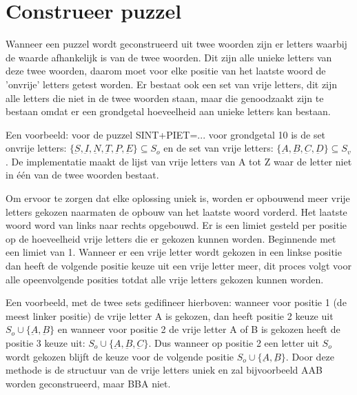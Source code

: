 \documentclass[twocolumn,10pt]{article}
\begin{document}
\section*{Construeer puzzel}
Wanneer een puzzel wordt geconstrueerd uit twee woorden zijn er letters waarbij de waarde afhankelijk is van de twee woorden. Dit zijn alle unieke letters van deze twee woorden, daarom moet voor elke positie van het laatste woord de 'onvrije' letters getest worden. Er bestaat ook een set van vrije letters, dit zijn alle letters die niet in de twee woorden staan, maar die genoodzaakt zijn te bestaan omdat er een grondgetal hoeveelheid aan unieke letters kan bestaan.

Een voorbeeld: voor de puzzel SINT+PIET=... voor grondgetal 10 is de set onvrije letters: $\{\underbar{S}, \underbar{I}, \underbar{N}, \underbar{T}, \underbar{P}, \underbar{E}\} \subseteq S_o$ en de set van vrije letters: $\{ \underbar{A}, \underbar{B}, \underbar{C}, \underbar{D} \} \subseteq S_v$. De implementatie maakt de lijst van vrije letters van A tot Z waar de letter niet in \'e\'en van de twee woorden bestaat.

Om ervoor te zorgen dat elke oplossing uniek is, worden er opbouwend meer vrije letters gekozen naarmaten de opbouw van het laatste woord vorderd. Het laatste woord word van links naar rechts opgebouwd. Er is een limiet gesteld per positie op de hoeveelheid vrije letters die er gekozen kunnen worden. Beginnende met een limiet van 1. Wanneer er een vrije letter wordt gekozen in een linkse positie dan heeft de volgende positie keuze uit een vrije letter meer, dit proces volgt voor alle opeenvolgende posities totdat alle vrije letters gekozen kunnen worden.

Een voorbeeld, met de twee sets gedifineer hierboven: wanneer voor positie 1 (de meest linker positie) de vrije letter A is gekozen, dan heeft positie 2 keuze uit $S_o \cup \{\underbar{A}, \underbar{B}\}$ en wanneer voor positie 2 de vrije letter A of B is gekozen heeft de positie 3 keuze uit: $S_o \cup \{\underbar{A}, \underbar{B}, \underbar{C}\}$. Dus wanneer op positie 2 een letter uit $S_o$ wordt gekozen blijft de keuze voor de volgende positie $S_o \cup \{\underbar{A}, \underbar{B}\}$. Door deze methode is de structuur van de vrije letters uniek en zal bijvoorbeeld AAB worden geconstrueerd, maar BBA niet.
\end{document}
